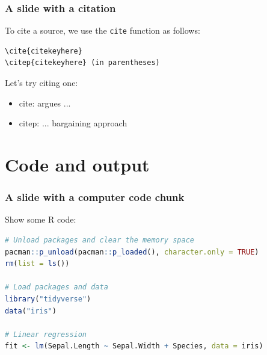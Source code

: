 \documentclass[12pt]{beamer}
\begin{document}
\begin{frame}[fragile]\frametitle{A slide with a citation}
 
To cite a source, we use the {\tt cite} function as follows:

{\footnotesize
\begin{verbatim}
\cite{citekeyhere}
\citep{citekeyhere} (in parentheses)
\end{verbatim}
}

Let's try citing one:
\begin{itemize}
	\item cite: \cite{fearonRationalistExplanationsWar1995} argues ...
	\item citep: ... bargaining approach \citep{fearonRationalistExplanationsWar1995}
\end{itemize}
 


\end{frame}





\section{Code and output}

\begin{frame}[fragile]\frametitle{A slide with a computer code chunk}

Show some R code:

\begin{lstlisting}[language=R]
# Unload packages and clear the memory space
pacman::p_unload(pacman::p_loaded(), character.only = TRUE)
rm(list = ls())

# Load packages and data
library("tidyverse")
data("iris")

# Linear regression
fit <- lm(Sepal.Length ~ Sepal.Width + Species, data = iris)
\end{lstlisting}

\end{frame}
\end{document}
